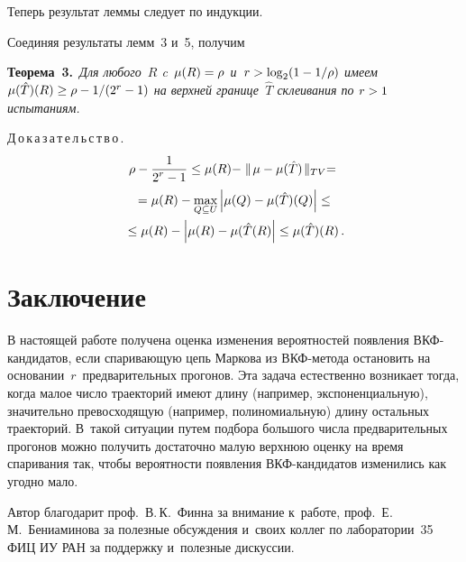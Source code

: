 \begin{multicols}{2}
    Теперь результат леммы следует по индукции.
    
    Соединяя результаты лемм~3 и~5, получим
    
    \smallskip
    
    \noindent
    \textbf{Теорема~3.}\ \textit{Для любого~$R$ c~$\mu(R)\hm=\rho$ 
и~$r\hm> \log_2(1-1/\rho)$ имеем $\mu(\hat{T})(R)\hm\geq \rho\hm- 1/(2^r-1)$ 
на верхней границе~$\hat{T}$ склеивания по $r\hm>1$ испытаниям.}
    
    \smallskip
    
    \noindent
    Д\,о\,к\,а\,з\,а\,т\,е\,л\,ь\,с\,т\,в\,о\,. 
    \begin{multline*}
    \rho-\displaystyle\frac{\displaystyle 1\mathstrut}{\displaystyle 2^r-1\mathstrut}\leq \mu(R)-\parallel\! \mu-\mu(\hat{T})\!\parallel_{TV}={}\\
    {}= \mu(R)-\max\limits_{Q\subseteq U}\left\vert \mu(Q) -
\mu(\hat{T})(Q)\right\vert \leq{}\\
    {}\leq \mu(R) -\left\vert \mu(R) -\mu(\hat{T}(R)\right\vert \leq 
\mu(\hat{T})(R)\,.
    \end{multline*}

\section{Заключение}

    В настоящей работе получена оценка изменения вероятностей появления 
ВКФ-кандидатов, если спаривающую цепь Маркова из ВКФ-метода 
остановить на основании~$r$~предварительных прогонов. Эта задача 
естественно возникает тогда, когда малое число траекторий имеют длину 
(например, экспоненциальную), значительно превосходящую (например, 
полиномиальную) длину остальных траекторий. В~такой ситуации путем 
подбора большого числа предварительных прогонов можно получить 
достаточно малую верхнюю оценку на время спаривания так, чтобы 
вероятности появления ВКФ-кан\-ди\-да\-тов изменились как угодно мало.
    
    \bigskip
    
    Автор благодарит проф.\ В.\,К.~Финна за внимание к~работе, проф.\ 
Е.\,М.~Бениаминова за полезные обсуждения и~своих коллег по 
лаборатории~35 ФИЦ ИУ РАН за поддержку и~полезные дискуссии.
    

\end{multicols}

